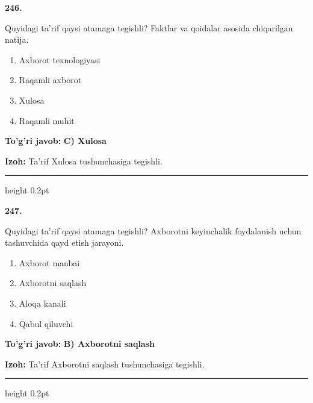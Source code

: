 \documentclass[10pt,a4paper,oneside]{article}
\begin{document}
\noindent\textbf{\color{ink}246.}
\par
Quyidagi ta'rif qaysi atamaga tegishli? Faktlar va qoidalar asosida chiqarilgan natija.
\begin{enumerate}[label=\Alph*),leftmargin=9mm]
\item Axborot texnologiyasi
\item Raqamli axborot
\item Xulosa
\item Raqamli muhit
\end{enumerate}
\begin{tcolorbox}[enhanced,breakable,colback=teal!4,colframe=teal!50!black,boxrule=0.5pt,arc=1.1mm,left=3mm,right=3mm,top=1.7mm,bottom=1.7mm,before skip=2mm,after skip=2mm]
\textbf{\color{teal}To'g'ri javob:} \textbf{C) Xulosa}
\par\smallskip
\textbf{Izoh:} Ta'rif Xulosa tushunchasiga tegishli.
\end{tcolorbox}
\vspace{2mm}\hrule height 0.2pt \vspace{3mm}

\noindent\textbf{\color{ink}247.}
\par
Quyidagi ta'rif qaysi atamaga tegishli? Axborotni keyinchalik foydalanish uchun tashuvchida qayd etish jarayoni.
\begin{enumerate}[label=\Alph*),leftmargin=9mm]
\item Axborot manbai
\item Axborotni saqlash
\item Aloqa kanali
\item Qabul qiluvchi
\end{enumerate}
\begin{tcolorbox}[enhanced,breakable,colback=teal!4,colframe=teal!50!black,boxrule=0.5pt,arc=1.1mm,left=3mm,right=3mm,top=1.7mm,bottom=1.7mm,before skip=2mm,after skip=2mm]
\textbf{\color{teal}To'g'ri javob:} \textbf{B) Axborotni saqlash}
\par\smallskip
\textbf{Izoh:} Ta'rif Axborotni saqlash tushunchasiga tegishli.
\end{tcolorbox}
\vspace{2mm}\hrule height 0.2pt \vspace{3mm}
\end{document}
